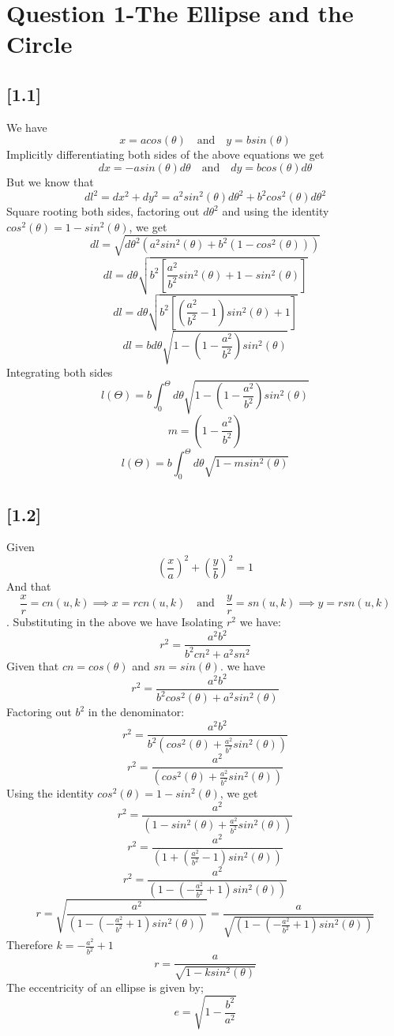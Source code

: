 \documentclass{WitsHomework}
\begin{document}
\section*{Question 1-The Ellipse and the Circle}
\subsection*{[1.1]}
We have 
$$x=acos(\theta) \quad\text{and}\quad y=bsin(\theta)$$
Implicitly differentiating both sides of the above equations we get
$$dx=-asin(\theta)d\theta \quad\text{and}\quad dy=bcos(\theta)d\theta$$
But we know that 
$$dl^2=dx^2+dy^2=a^2sin^2(\theta)d\theta^2+b^2cos^2(\theta)d\theta^2$$
Square rooting both sides, factoring out $d\theta^2$ and using the identity $cos^2(\theta)=1-sin^2(\theta)$, we get
$$dl=\sqrt{d\theta^2(a^2sin^2(\theta)+b^2(1-cos^2(\theta)))}$$
$$dl=d\theta\sqrt{b^2[\frac{a^2}{b^2}sin^2(\theta)+1-sin^2(\theta)]}$$
$$dl=d\theta\sqrt{b^2[(\frac{a^2}{b^2}-1)sin^2(\theta)+1]}$$
$$dl=bd\theta\sqrt{1-(1-\frac{a^2}{b^2})sin^2(\theta)}$$
Integrating both sides
$$l(\Theta)=b\int_{0}^{\Theta}d\theta\sqrt{1-(1-\frac{a^2}{b^2})sin^2(\theta)}$$
$$m=(1-\frac{a^2}{b^2})$$
$$l(\Theta)=b\int_{0}^{\Theta}d\theta\sqrt{1-msin^2(\theta)}$$

\subsection*{[1.2]}
Given
$$\left(\frac{x}{a}\right)^2+\left(\frac{y}{b}\right)^2=1$$
And that 
$$\frac{x}{r}=cn(u,k)\implies x=rcn(u,k)\quad\text{and}\quad \frac{y}{r}=sn(u,k)\implies y=rsn(u,k)$$. Substituting in the above we have
Isolating $r^2$ we have:
$$r^2=\frac{a^2b^2}{b^2cn^2+a^2sn^2}$$
Given that $cn=cos(\theta)$ and $sn=sin(\theta)$. we have
$$r^2=\frac{a^2b^2}{b^2cos^2(\theta)+a^2sin^2(\theta)}$$
Factoring out $b^2$ in the denominator:
$$r^2=\frac{a^2b^2}{b^2\left( cos^2(\theta)+\frac{a^2}{b^2}sin^2(\theta)\right)}$$
$$r^2=\frac{a^2}{\left( cos^2(\theta)+\frac{a^2}{b^2}sin^2(\theta)\right)}$$
Using the identity $cos^2(\theta)=1-sin^2(\theta)$, we get
$$r^2=\frac{a^2}{\left(1- sin^2(\theta)+\frac{a^2}{b^2}sin^2(\theta)\right)}$$
$$r^2=\frac{a^2}{\left(1+(\frac{a^2}{b^2}-1)sin^2(\theta)\right)}$$
$$r^2=\frac{a^2}{\left(1-(-\frac{a^2}{b^2}+1)sin^2(\theta)\right)}$$
$$r=\sqrt{\frac{a^2}{\left(1-(-\frac{a^2}{b^2}+1)sin^2(\theta)\right)}}=\frac{a}{\sqrt{\left(1-(-\frac{a^2}{b^2}+1)sin^2(\theta)\right)}}$$
Therefore $k=-\frac{a^2}{b^2}+1$
$$r=\frac{a}{\sqrt{1-ksin^2(\theta)}}$$
The eccentricity of an ellipse is given by;
$$e=\sqrt{1-\frac{b^2}{a^2}}$$
\end{document}
